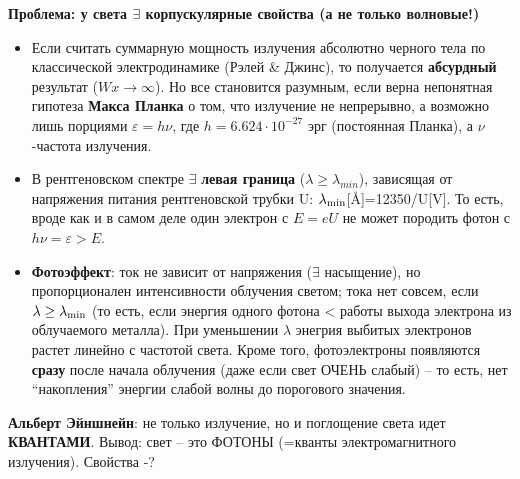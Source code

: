 


\centerline{\large\bf Проблема: у света $\exists$ корпускулярные свойства
 (а не только волновые!)}
\begin{itemize}
\item Если считать суммарную мощность излучения абсолютно черного тела по классической электродинамике (Рэлей \& Джинс), то получается {\bf абсурдный} результат ($W x\rightarrow\infty$). Но все становится разумным, если верна непонятная гипотеза {\bf Макса Планка} о том, что излучение не непрерывно, а возможно лишь порциями $\varepsilon=h\nu$, где $h=6.624\cdot10^{-27}$ эрг (постоянная Планка), а $\nu$ -частота излучения.
\item В рентгеновском спектре $\exists$ {\bf левая граница} ($\lambda\geq\lambda_{min}$), зависящая от напряжения питания рентгеновской трубки U: $\lambda_{\rm min}$[{\AA}]=12350/U[V]. То есть, вроде как и в самом деле один электрон с $E=eU$ не может породить фотон с $h\nu=\varepsilon>E$.
\item {\bf Фотоэффект}: ток не зависит от напряжения ($\exists$ насыщение), но пропорционален ин\-тен\-сив\-но\-с\-ти облучения светом; тока нет совсем, если $\lambda\geq\lambda_{\rm min}$ (то есть, если энергия одного фотона < работы выхода электрона из облучаемого металла). При уменьшении $\lambda$ энегрия выбитых электронов растет линейно с частотой света. Кроме того, фотоэлектроны появляются {\bf сразу} после начала облучения (даже если свет ОЧЕНЬ слабый) --  то есть, нет ``накопления'' энергии слабой волны до порогового значения.
\end{itemize}
{\bf Альберт Эйншнейн}: не только излучение, но и поглощение света идет {\bf КВАНТАМИ}.
Вывод: свет -- это ФОТОНЫ (=кванты электромагнитного излучения). Свойства -?

